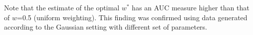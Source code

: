 \documentclass[11pt]{article} %
\begin{document}
Note that   the estimate of the optimal $w^{*}$ has  an AUC measure higher than  that of $w$=0.5 (uniform weighting). This finding was confirmed using data generated 
according to  the Gaussian setting with different set of parameters.

\end{document}
